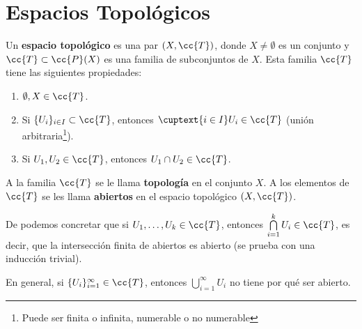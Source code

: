 
\chapter{Espacios Topológicos}

\begin{definicion}
    Un \textbf{espacio topológico} es una par $(X, \cc{T})$, donde $X \neq \emptyset$ es un conjunto y $\cc{T}\subset\cc{P}(X)$ es una familia de subconjuntos de $X$. Esta familia $\cc{T}$ tiene las siguientes propiedades:

    \begin{enumerate}
        \item[\objetivo{A1}] $\emptyset, X \in \cc{T}$.
        \item[\objetivo{A2}] Si $\{U_i\}_{i\in I} \subset \cc{T}$, entonces $\cuptext{i\in I} U_i \in \cc{T}$ (unión arbitraria\footnote{Puede ser finita o infinita, numerable o no numerable}).
        \item[\objetivo{A3}] Si $U_1, U_2 \in \cc{T}$, entonces $U_1 \cap U_2 \in \cc{T}$.
    \end{enumerate}

    A la familia $\cc{T}$ se le llama \textbf{topología} en el conjunto $X$. A los elementos de $\cc{T}$ se les llama \textbf{abiertos} en el espacio topológico $(X, \cc{T})$.
    \endsquare
\end{definicion}

\begin{observacion}
    De  podemos concretar que si $U_1, \dots, U_k \in \cc{T}$, entonces $\bigcap\limits_{i=1}^{k}U_i \in \cc{T}$, es decir, que la intersección finita de abiertos es abierto (se prueba con una inducción trivial).

    En general, si $\{U_i\}_{i=1}^{\infty}\in \cc{T}$, entonces $\bigcup\limits_{i=1}^{\infty}U_i$ no tiene por qué ser abierto.
    \endsquare
\end{observacion}

